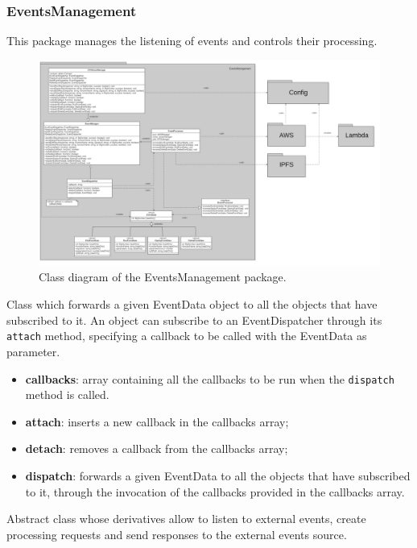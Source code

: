 	\subsubsection{EventsManagement}
	This package manages the listening of events and controls their processing.
	\begin{figure} [h!]
		\centering
		\includegraphics[width=1.1\linewidth]{diagrammi/etherless-server/Eventsmanager}
		\caption{Class diagram of the EventsManagement package.}
	\end{figure}
	Class which forwards a given EventData object to all the objects that have subscribed to it. An object can subscribe to an EventDispatcher through its \texttt{attach} method, specifying a callback to be called with the EventData as parameter.
	\begin{itemize}
		\item \textbf{callbacks}: array containing all the callbacks to be run when the \texttt{dispatch} method is called.
	\end{itemize}
	\begin{itemize}
		\item \textbf{attach}: inserts a new callback in the callbacks array;
		\item \textbf{detach}: removes a callback from the callbacks array;
		\item \textbf{dispatch}: forwards a given EventData to all the objects that have subscribed to it, through the invocation of the callbacks provided in the callbacks array.
	\end{itemize}
	Abstract class whose derivatives allow to listen to external events, create processing requests and send responses to the external events source.

